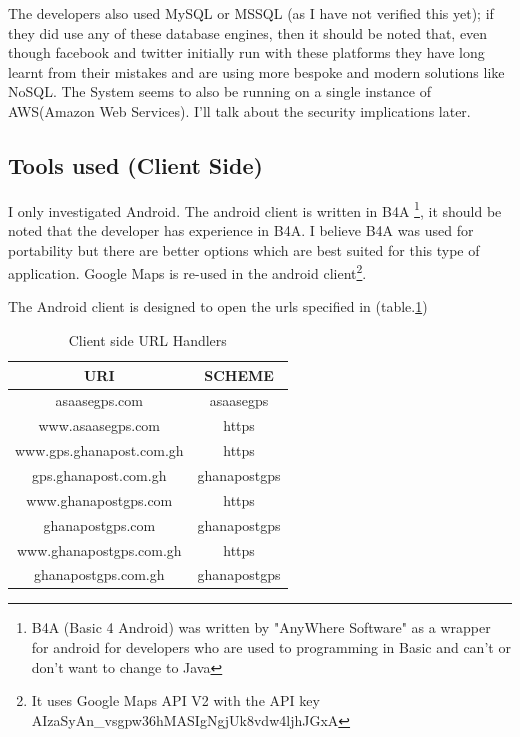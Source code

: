 \documentclass[conference,compsoc]{IEEEtran}
\begin{document}
The developers also used MySQL or MSSQL (as I have not verified this yet); if they did use any of these database engines, then it should be noted that, even though facebook and twitter initially run with these platforms they have long learnt from their mistakes and are using more bespoke and modern solutions like NoSQL.
\newline
The System seems to also be running on a single instance of AWS(Amazon Web Services). \newline I'll talk about the security implications later.


\subsection{Tools used (Client Side)}
I only investigated Android. The android client is written in B4A 
\footnote{B4A (Basic 4 Android) was written by "AnyWhere Software" as a wrapper for android for developers who are used to programming in Basic and can't or don't want to change to Java}\cite{b4awebsite}, it should be noted that the developer has experience in B4A. I believe B4A was used for portability but there are better options which are best suited for this type of application. Google Maps is re-used in the android client\footnote{It uses Google Maps API V2 with the API key AIzaSyAn\_vsgpw36hMASIgNgjUk8vdw4ljhJGxA}. \newline

The Android client is designed to open the urls specified in (table.\ref{table_androidurls})
\newline

\begin{table}
	\renewcommand{\arraystretch}{1.5}
	\caption{Client side URL Handlers}
	\label{table_androidurls}
	\centering
	\begin{tabular}{|c|c|}
		\hline 
		URI & SCHEME \\
		\hline
		asaasegps.com & asaasegps \\ \hline
		www.asaasegps.com & https \\ \hline
		www.gps.ghanapost.com.gh & https \\ \hline
		gps.ghanapost.com.gh & ghanapostgps \\ \hline
		www.ghanapostgps.com & https \\ \hline
		ghanapostgps.com & ghanapostgps \\ \hline
		www.ghanapostgps.com.gh & https \\ \hline
		ghanapostgps.com.gh & ghanapostgps \\ 
		\hline
	\end{tabular}
\end{table}
\end{document}
